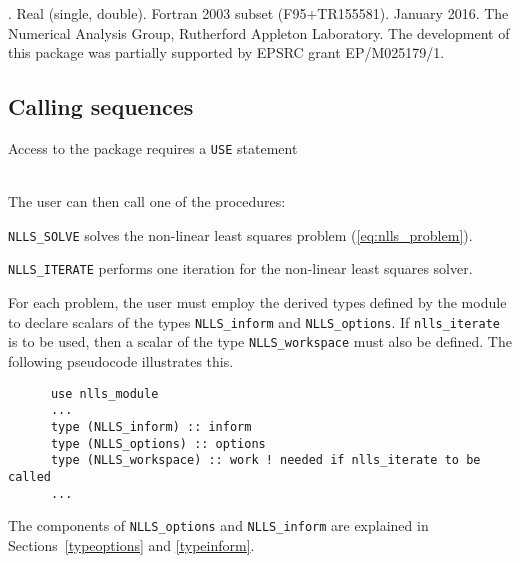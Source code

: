 \documentclass{spec}
\begin{document}
\hslheader

\hslsummary



\hslattributes
\hslversions{\versionum\ (\versiondate)}.
\hslIRDCZ Real (single, double).
\hsllanguage Fortran 2003 subset (F95+TR155581).
\hsldate January 2016.
\hslorigin The Numerical Analysis Group, Rutherford Appleton Laboratory.
\hslremark The development of this package was
partially supported by EPSRC grant EP/M025179/1.

\newpage
\hslhowto

\subsection{Calling sequences}

Access to the package requires a {\tt USE} statement \\ \\
\indent\hspace{5mm}{\tt use ral\_nlls\_double}
\medskip

\noindent The user can then call one of the procedures:
\vspace{-0.1cm}
\begin{description}
\item {\tt NLLS\_SOLVE}  solves the non-linear least squares problem (\ref{eq:nlls_problem}).
\item {\tt NLLS\_ITERATE} performs one iteration for the non-linear least squares solver.
\end{description}


\hsltypes
\label{derived types}
For each problem, the user must employ the derived types defined by the
module to declare scalars of the types {\tt NLLS\_inform} and
{\tt NLLS\_options}.  If {\tt nlls\_iterate} is to be used, then
a scalar of the type {\tt NLLS\_workspace} must also be defined.
The following pseudocode illustrates this.
\begin{verbatim}
      use nlls_module
      ...
      type (NLLS_inform) :: inform
      type (NLLS_options) :: options
      type (NLLS_workspace) :: work ! needed if nlls_iterate to be called
      ...
\end{verbatim}
The components of {\tt NLLS\_options} and {\tt NLLS\_inform} are explained
in Sections~\ref{typeoptions} and \ref{typeinform}.
\end{document}
